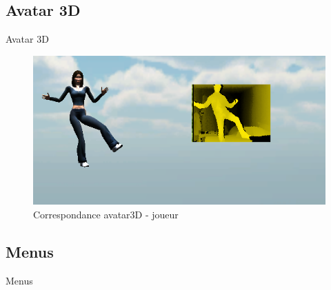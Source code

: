 \subsection{Avatar 3D}
\begin{frame}{Avatar 3D}
\begin{figure}
\begin{center}
\includegraphics[width=0.9\linewidth]{../images/avatar3D}
\caption{Correspondance avatar3D - joueur}
\end{center}
\end{figure}
\end{frame}

\subsection{Menus}
\begin{frame}{Menus}
\begin{figure}
\begin{center}
\end{center}
\end{figure}
\end{frame}

